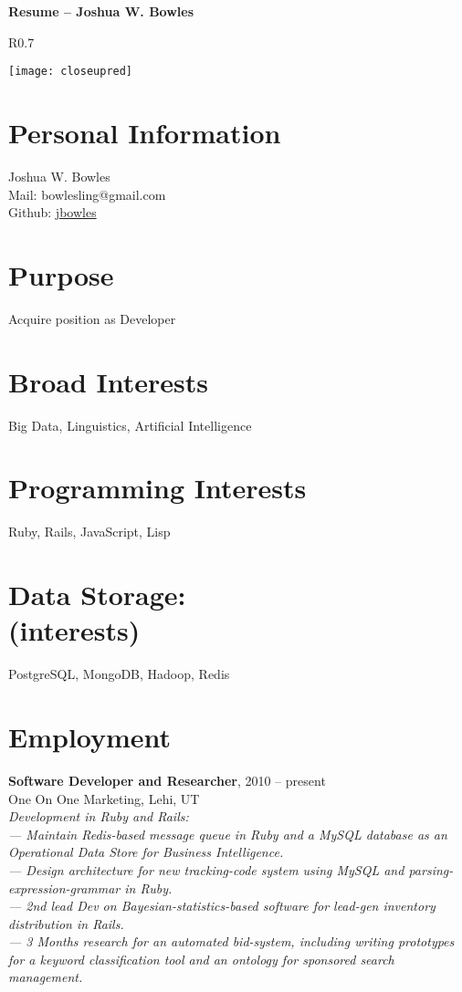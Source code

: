 \documentclass[margin,line]{resume}
\begin{document}
{\sc \Large {\bf Resume -- Joshua W. Bowles}}
\begin{resume}
	\begin{wrapfigure}{R}{0.7\textwidth}
		\begin{center}
	\texttt{[image: closeupred]}
	\end{center}
	\end{wrapfigure}

\section{Personal Information}
Joshua W. Bowles\\
Mail: bowlesling@gmail.com\\
Github: \href{https://github.com/jbowles}{jbowles}

\section{Purpose}
Acquire position as Developer
\section{Broad Interests}
Big Data, Linguistics, Artificial Intelligence
\section{Programming Interests} 
Ruby, Rails, JavaScript, Lisp
\section{Data Storage:\\ \small(interests)}
 PostgreSQL, MongoDB, Hadoop, Redis

\section{Employment}
{\bf Software Developer and Researcher}, \hfill 2010 -- present\\
	One On One Marketing, Lehi, UT\\
	\textsl{Development in Ruby and Rails:\\
	--- Maintain Redis-based message queue in Ruby and a MySQL database as an Operational Data Store for Business Intelligence.\\ 
	--- Design architecture for new tracking-code system using MySQL and parsing-expression-grammar in Ruby.\\ 
	--- 2nd lead Dev on Bayesian-statistics-based software for lead-gen inventory distribution in Rails.\\
	--- 3 Months research for an automated bid-system, including writing prototypes for a keyword classification tool and an ontology for sponsored search management.
	 				}
					

\end{resume}
\end{document}
